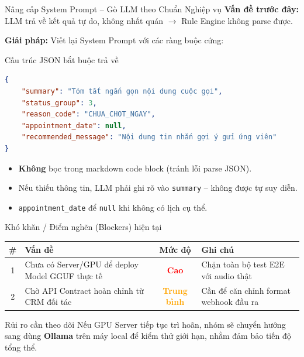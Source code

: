 \begin{frame}[fragile]{Nâng cấp System Prompt -- Gò LLM theo Chuẩn Nghiệp vụ}
    \textbf{Vấn đề trước đây:} LLM trả về kết quả tự do, không nhất quán $\rightarrow$ Rule Engine không parse được.

    \vspace{0.3cm}
    \textbf{Giải pháp:} Viết lại System Prompt với các ràng buộc cứng:
    \begin{exampleblock}{Cấu trúc JSON bắt buộc trả về}
    \begin{lstlisting}[language=json, basicstyle=\tiny]
{
    "summary": "Tóm tắt ngắn gọn nội dung cuộc gọi",
    "status_group": 3,
    "reason_code": "CHUA_CHOT_NGAY",
    "appointment_date": null,
    "recommended_message": "Nội dung tin nhắn gợi ý gửi ứng viên"
}
    \end{lstlisting}
    \end{exampleblock}
    \begin{itemize}
        \item \scriptsize \textbf{Không} bọc trong markdown code block (tránh lỗi parse JSON).
        \item \scriptsize Nếu thiếu thông tin, LLM phải ghi rõ vào \texttt{summary} -- không được tự suy diễn.
        \item \scriptsize \texttt{appointment\_date} để \texttt{null} khi không có lịch cụ thể.
    \end{itemize}
\end{frame}


\begin{frame}{Khó khăn / Điểm nghẽn (Blockers) hiện tại}
    \begin{table}[]
        \centering
        \renewcommand{\arraystretch}{1.5}
        \begin{tabular}{|c|p{5cm}|c|p{3.5cm}|}
            \hline
            \textbf{\#} & \textbf{Vấn đề} & \textbf{Mức độ} & \textbf{Ghi chú} \\ \hline
            1 & Chưa có Server/GPU để deploy Model GGUF thực tế & \textcolor{red}{\textbf{Cao}} & Chặn toàn bộ test E2E với audio thật \\ \hline
            2 & Chờ API Contract hoàn chỉnh từ CRM đối tác & \textcolor{orange}{\textbf{Trung bình}} & Cần để căn chỉnh format webhook đầu ra \\ \hline
        \end{tabular}
    \end{table}
    \vspace{0.3cm}
    \begin{block}{Rủi ro cần theo dõi}
        Nếu GPU Server tiếp tục trì hoãn, nhóm sẽ chuyển hướng sang dùng \textbf{Ollama} trên máy local để kiểm thử giới hạn, nhằm đảm bảo tiến độ tổng thể.
    \end{block}
\end{frame}


